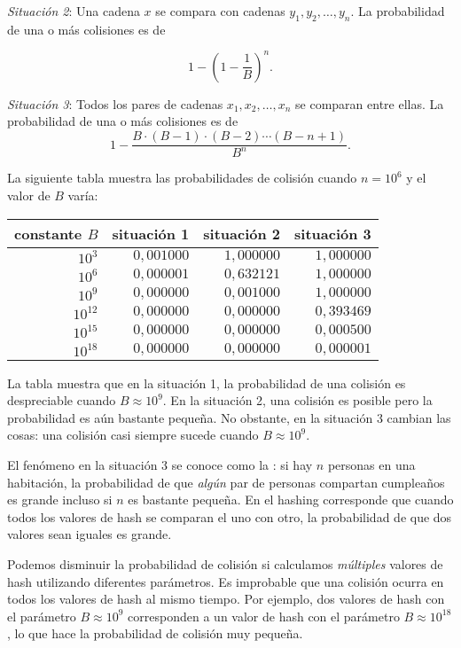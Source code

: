 \textit{Situación 2}: Una cadena $x$ se compara con cadenas
$y_1,y_2,\ldots,y_n$. La probabilidad de una o más colisiones es de

\[1-\left(1-\frac{1}{B}\right)^n.\]

\textit{Situación 3}: Todos los pares de cadenas $x_1,x_2,\ldots,x_n$
se comparan entre ellas. La probabilidad de una o más colisiones es de
\[ 1 - \frac{B \cdot (B-1) \cdot (B-2) \cdots (B-n+1)}{B^n}.\]

La siguiente tabla muestra las probabilidades de colisión cuando
$n=10^6$ y el valor de $B$ varía:

\begin{center}
    \begin{tabular}{rrrr}
        constante $B$ & situación 1 & situación 2 & situación 3 \\
        \hline
        $10^3$        & $0,001000$  & $1,000000$  & $1,000000$  \\
        $10^6$        & $0,000001$  & $0,632121$  & $1,000000$  \\
        $10^9$        & $0,000000$  & $0,001000$  & $1,000000$  \\
        $10^{12}$     & $0,000000$  & $0,000000$  & $0,393469$  \\
        $10^{15}$     & $0,000000$  & $0,000000$  & $0,000500$  \\
        $10^{18}$     & $0,000000$  & $0,000000$  & $0,000001$  \\
    \end{tabular}
\end{center}

La tabla muestra que en la situación 1, la probabilidad de una colisión
es despreciable cuando $B \approx 10^9$. En la situación 2, una colisión
es posible pero la probabilidad es aún bastante pequeña. No obstante, en
la situación 3 cambian las cosas: una colisión casi siempre sucede cuando
$B \approx 10^9$.


El fenómeno en la situación 3 se conoce como la : si hay $n$ personas en una habitación, la probabilidad de
que \emph{algún} par de personas compartan cumpleaños es grande incluso
si $n$ es bastante pequeña. En el hashing corresponde que cuando todos
los valores de hash se comparan el uno con otro, la probabilidad de que
dos valores sean iguales es grande.

Podemos disminuir la probabilidad de colisión si calculamos \emph{múltiples}
valores de hash utilizando diferentes parámetros. Es improbable que una
colisión ocurra en todos los valores de hash al mismo tiempo. Por ejemplo,
dos valores de hash con el parámetro $B \approx 10^9$ corresponden a un
valor de hash con el parámetro $B \approx 10^{18}$, lo que hace la
probabilidad de colisión muy pequeña.

